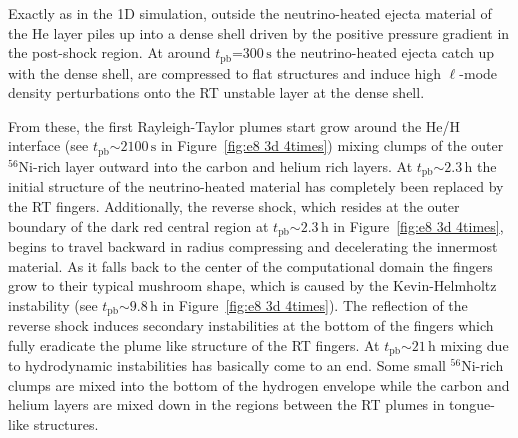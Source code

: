 \documentclass[fleqn,usenatbib]{mnras}
\newcommand{\tpb}{\ensuremath{t_{\text{pb}}}}
\newcommand{\nickel}{\ensuremath{\mathrm{^{56}Ni}}\xspace}
\newcommand{\s}{\ensuremath{\text{s}}}
\begin{document}
Exactly as in the 1D simulation, outside the neutrino-heated ejecta material of the He layer piles up into a dense shell driven by the positive pressure gradient in the post-shock region. At around $\tpb\mathord{=}300\,\s$ the neutrino-heated ejecta catch up with the dense shell, are compressed to flat structures and induce high $\ell$-mode density perturbations onto the RT unstable layer at the dense shell. 

From these, the first Rayleigh-Taylor plumes start grow around the He/H interface (see $\tpb\mathord{\sim}2100\,\s$ in Figure~\ref{fig:e8 3d 4times}) mixing clumps of the outer \nickel-rich layer outward into the carbon and helium rich layers.
At $\tpb\mathord{\sim}2.3\,\text{h}$ the initial structure of the neutrino-heated material has completely been replaced by the RT fingers. Additionally, the reverse shock, which resides at the outer boundary of the dark red central region at $\tpb\mathord{\sim}2.3\,\text{h}$ in Figure~\ref{fig:e8 3d 4times}, begins to travel backward in radius compressing and decelerating the innermost material. As it falls back to the center of the computational domain the fingers grow to their typical mushroom shape, which is caused by the Kevin-Helmholtz instability (see $\tpb\mathord{\sim}9.8\,\text{h}$ in Figure~\ref{fig:e8 3d 4times}).
The reflection of the reverse shock induces secondary instabilities at the bottom of the fingers which fully eradicate the plume like structure of the RT fingers. 
At $\tpb\mathord{\sim}21\,\text{h}$ mixing due to hydrodynamic instabilities has basically come to an end. Some small \nickel-rich clumps are mixed into the bottom of the hydrogen envelope while the carbon and helium layers are mixed down in the regions between the RT plumes in tongue-like structures. 
\end{document}
